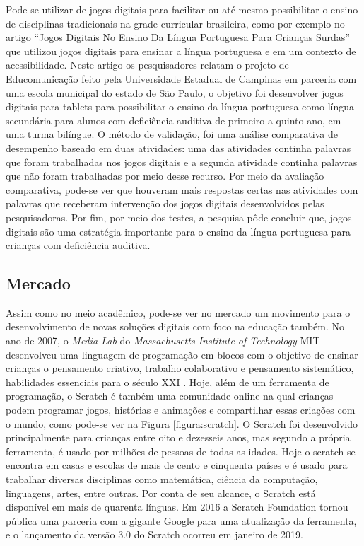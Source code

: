 Pode-se utilizar de jogos digitais para facilitar ou até mesmo possibilitar o ensino de disciplinas tradicionais na grade curricular brasileira, como por exemplo no artigo “Jogos Digitais No Ensino Da Língua Portuguesa Para Crianças Surdas” \cite{liz_2017} que utilizou jogos digitais para ensinar a língua portuguesa e em um contexto de acessibilidade. Neste artigo os pesquisadores relatam o projeto de Educomunicação feito pela Universidade Estadual de Campinas em parceria com uma escola municipal do estado de São Paulo, o objetivo foi desenvolver jogos digitais para tablets para possibilitar o ensino da língua portuguesa como língua secundária para alunos com deficiência auditiva de primeiro a quinto ano, em uma turma bilíngue. O método de validação, foi uma análise comparativa de desempenho baseado em duas atividades: uma das atividades continha palavras que foram trabalhadas nos jogos digitais e a segunda atividade continha palavras que não foram trabalhadas por meio desse recurso. Por meio da avaliação comparativa, pode-se ver que houveram mais respostas certas nas atividades com palavras que receberam intervenção dos jogos digitais desenvolvidos pelas pesquisadoras. Por fim, por meio dos testes, a  pesquisa pôde concluir que, jogos digitais são uma estratégia importante para o ensino da língua portuguesa para crianças com deficiência auditiva.

\subsection{Mercado}
Assim como no meio acadêmico, pode-se ver no mercado um movimento para o desenvolvimento de novas soluções digitais com foco na educação também. 
No ano de 2007, o \textit{Media Lab} do \textit{Massachusetts Institute of Technology} MIT desenvolveu uma linguagem de programação em blocos com o objetivo de ensinar crianças o pensamento criativo, trabalho colaborativo e pensamento sistemático, habilidades essenciais para o século XXI \cite{about_scratch}. Hoje, além de um ferramenta de programação, o Scratch é também uma comunidade online na qual crianças podem programar jogos, histórias e animações e compartilhar essas criações com o mundo, como pode-se ver na Figura \ref{figura:scratch}. O Scratch foi desenvolvido principalmente para crianças entre oito e dezesseis anos, mas segundo a própria ferramenta, é usado por milhões de pessoas de todas as idades. Hoje o scratch se encontra em casas e escolas de mais de cento e cinquenta países e é usado para trabalhar diversas disciplinas como matemática, ciência da computação, linguagens, artes, entre outras. Por conta de seu alcance, o Scratch está disponível em mais de quarenta línguas. Em 2016 a Scratch Foundation tornou pública uma parceria com a gigante Google para uma atualização da ferramenta, e o lançamento da versão 3.0 do Scratch ocorreu em janeiro de 2019.


